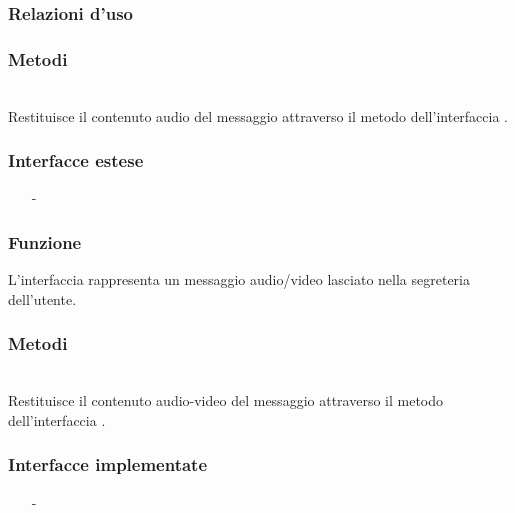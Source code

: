 \subsubsection*{Relazioni d'uso}

\subsubsection*{Metodi}
\begin{description}
  \item{}\\
Restituisce il contenuto audio del messaggio attraverso il metodo  dell'interfaccia .
\end{description}


\subsubsection*{Interfacce estese}
\begin{itemize}[noitemsep,nolistsep]
  \item[-] 
\end{itemize}

\subsubsection*{Funzione}
L'interfaccia rappresenta un messaggio audio/video lasciato nella segreteria dell'utente.

\subsubsection*{Metodi}
\begin{description}
  \item{}\\
Restituisce il contenuto audio-video del messaggio attraverso il metodo  dell'interfaccia .
\end{description}


\subsubsection*{Interfacce implementate}
\begin{itemize}[noitemsep,nolistsep]
  \item[-] 
\end{itemize}

